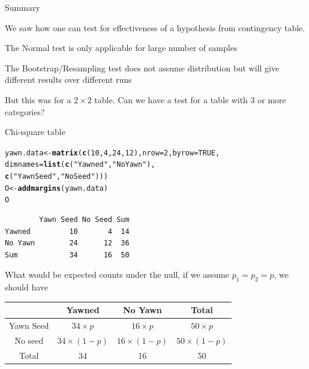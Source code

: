 \documentclass{beamer}\usepackage[]{graphicx}\usepackage[]{color}
\makeatletter
\newcommand{\hlnum}[1]{\textcolor[rgb]{0.2,0.2,0.2}{#1}}%
\newcommand{\hlstr}[1]{\textcolor[rgb]{0.2,0.2,0.2}{#1}}%
\newcommand{\hlstd}[1]{\textcolor[rgb]{0.102,0.102,0.102}{#1}}%
\newcommand{\hlkwb}[1]{\textcolor[rgb]{0.102,0.102,0.102}{#1}}%
\newcommand{\hlkwc}[1]{\textcolor[rgb]{0.2,0.2,0.2}{#1}}%
\newcommand{\hlkwd}[1]{\textcolor[rgb]{0.102,0.102,0.102}{\textbf{#1}}}%
\newenvironment{kframe}{%
 \def\at@end@of@kframe{}%
 \ifinner\ifhmode%
  \def\at@end@of@kframe{\end{minipage}}%
  \begin{minipage}{\columnwidth}%
 \fi\fi%
 \def\FrameCommand##1{\hskip\@totalleftmargin \hskip-\fboxsep
 \colorbox{shadecolor}{##1}\hskip-\fboxsep
     \hskip-\linewidth \hskip-\@totalleftmargin \hskip\columnwidth}%
 \MakeFramed {\advance\hsize-\width
   \@totalleftmargin\z@ \linewidth\hsize
   \@setminipage}}%
 {\par\unskip\endMakeFramed%
 \at@end@of@kframe}
\newenvironment{knitrout}{}{} %
\renewenvironment{knitrout}{\begin{spacing}{0.75}\begin{tiny}}{\end{tiny}\end{spacing}}
\makeatother
\begin{document}
\begin{frame}[fragile]{Summary}

We saw how one can test for effectiveness of a hypothesis from contingency table.  \pause \newline

The Normal test is only applicable for large number of samples \pause \newline

The Bootstrap/Resampling test does not assume distribution but will give different results over different runs \pause \newline

But this was for a $2 \times 2$ table. Can we have a test for a table with 3 or more categories?  \pause \newline

\end{frame}

\begin{frame}[fragile]{Chi-square table}


\begin{knitrout}\small
{}\color{fgcolor}\begin{kframe}
\begin{alltt}
\hlstd{yawn.data} \hlkwb{<-} \hlkwd{matrix}\hlstd{(}\hlkwd{c}\hlstd{(}\hlnum{10}\hlstd{,}\hlnum{4}\hlstd{,}\hlnum{24}\hlstd{,}\hlnum{12}\hlstd{),} \hlkwc{nrow}\hlstd{=}\hlnum{2}\hlstd{,} \hlkwc{byrow}\hlstd{=}\hlnum{TRUE}\hlstd{,}
                \hlkwc{dimnames} \hlstd{=} \hlkwd{list}\hlstd{(}\hlkwd{c}\hlstd{(}\hlstr{"Yawned"}\hlstd{,} \hlstr{"No Yawn"}\hlstd{),}
                                \hlkwd{c}\hlstd{(}\hlstr{"Yawn Seed"}\hlstd{,} \hlstr{"No Seed"}\hlstd{)))}
\hlstd{O} \hlkwb{<-}  \hlkwd{addmargins}\hlstd{(yawn.data)}
\hlstd{O}
\end{alltt}
\begin{verbatim}
        Yawn Seed No Seed Sum
Yawned         10       4  14
No Yawn        24      12  36
Sum            34      16  50
\end{verbatim}
\end{kframe}
\end{knitrout}
\pause
What would be expected counts under the null, if we assume $p_{1}=p_{2}=p$, we should have

\begin{tabular}{|c|c|c|c|}
& Yawned & No Yawn & Total\\ \hline
Yawn Seed & $34 \times p$ & $16 \times p$  & $50 \times p$ \\ \hline
No seed & $34 \times (1-p)$ & $16 \times (1-p)$ & $50 \times (1-p)$ \\ \hline
Total  & 34 & 16 & 50  \\ \hline 
\end{tabular}

\end{frame}
\end{document}
